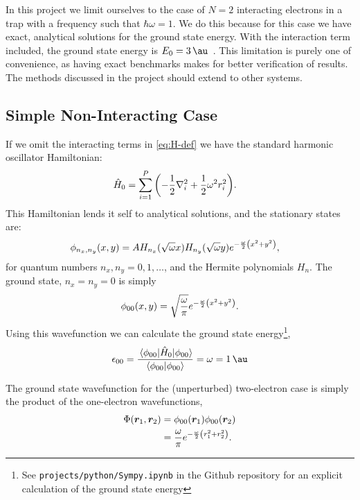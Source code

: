 \documentclass[a4paper, 11pt]{article}
\begin{document}
\begin{multicols}{2}
    In this project we limit ourselves to the case of $N=2$ interacting
    electrons in a trap with a frequency such that $\hbar \omega = 1$. We do
    this because for this case we have exact, analytical solutions for the
    ground state energy. With the interaction term included, the ground state
    energy is $E_0 = \SI{3}{\au}$~\cite{Taut1993}. This limitation is purely one
    of convenience, as having exact benchmarks makes for better verification of
    results. The methods discussed in the project should extend to other
    systems.

    \subsection{Simple Non-Interacting Case}
    If we omit the interacting terms in \autoref{eq:H-def} we have
    the standard harmonic oscillator Hamiltonian:
    \begin{align}
        \hat H_0 &= \sum_{i=1}^P\qty(-\frac{1}{2}\laplacian_i +
        \frac{1}{2}\omega^2 r_i^2).
    \end{align}
    This Hamiltonian lends it self to analytical solutions, and the stationary
    states are:
    \begin{align}
        \phi_{n_x, n_y}(x, y) &= A H_{n_x}(\sqrt\omega x)H_{n_y}(\sqrt\omega y)
        e^{-\frac{\omega}{2}\qty(x^2 + y^2)},
    \end{align} 
    for quantum numbers $n_x, n_y = 0, 1,\dots$, and the Hermite polynomials
    $H_n$. The ground state, $n_x=n_y=0$ is simply
    \begin{align}
        \phi_{00}(x,y) =
        \sqrt{\frac{\omega}{\pi}}e^{-\frac{\omega}{2}\qty(x^2+y^2)}.
    \end{align}
    Using this wavefunction we can calculate the ground state
    energy\footnote{\label{fnt:sympy}See \texttt{projects/python/Sympy.ipynb} in the Github
    repository for an explicit calculation of the ground state energy},
    \begin{align}
        \epsilon_{00} = \frac{\expval{\hat H_0}{\phi_{00}}}{\braket{\phi_{00}}}
        = \omega = \SI{1}{\au}
    \end{align}

    The ground state wavefunction for the (unperturbed) two-electron case is simply the
    product of the one-electron wavefunctions,
    \begin{align}
        \begin{split}
            \Phi(\bm r_1, \bm r_2) &= \phi_{00}(\bm r_1)\phi_{00}(\bm r_2)\\
            &= \frac{\omega}{\pi} e^{-\frac{\omega}{2}\qty(r_1^2+r_2^2)}.
        \end{split}\label{eq:Phi-non-inter}
    \end{align}


\end{multicols}
\end{document}
